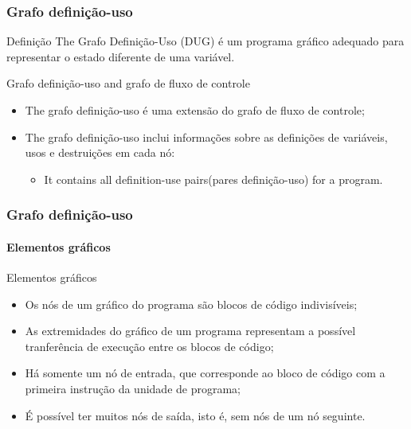 \begin{frame}[parent={cmap:structural-software-testing},hasnext=true,hasprev=true]
\frametitle{Grafo definição-uso}
\label{concept:program-graph}
\label{concept:definition-use-graph}
\label{concept:dug}

\begin{block:concept}{Definição}
The Grafo Definição-Uso (DUG) é um programa gráfico adequado para representar o estado diferente de uma variável.
\end{block:concept}

\begin{block:fact}{Grafo definição-uso and grafo de fluxo de controle}
\begin{itemize}
	\item The grafo definição-uso é uma extensão do grafo de fluxo de controle;

	\item The grafo definição-uso inclui informações sobre as definições de variáveis, usos e destruições em cada nó:
	\begin{itemize}
		\item It contains all definition-use pairs(pares definição-uso) for a program.
	\end{itemize}
\end{itemize}
\end{block:fact}
\end{frame}


\begin{frame}
\frametitle{Grafo definição-uso}
\framesubtitle{Elementos gráficos}
\label{concept:cfg-graph-elements}

\begin{block:fact}{Elementos gráficos}
\begin{itemize}
	\item Os nós de um gráfico do programa são blocos de código indivisíveis;

	\item As extremidades do gráfico de um programa representam a possível tranferência de execução entre os blocos de código;

	\item Há somente um nó de entrada, que corresponde ao bloco de código com a primeira instrução da unidade de programa;

	\item É possível ter muitos nós de saída, isto é, sem nós de um nó seguinte.
\end{itemize}
\end{block:fact}

\hfill
{}
\end{frame}



